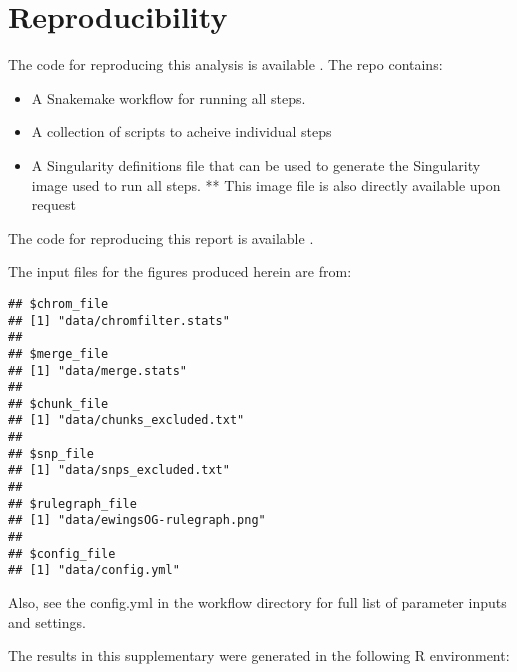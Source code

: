 \documentclass[]{article}
\providecommand{\tightlist}{%
  \setlength{\itemsep}{0pt}\setlength{\parskip}{0pt}}
\begin{document}
\newpage

\hypertarget{reproducibility}{%
\section{Reproducibility}\label{reproducibility}}

The code for reproducing this analysis is available
\href{https://github.com/pmonnahan/DataPrep/tree/master/postImpute/workflow}{{}}.
The repo contains:

\begin{itemize}
\tightlist
\item
  A Snakemake workflow for running all steps.
\item
  A collection of scripts to acheive individual steps
\item
  A Singularity definitions file that can be used to generate the
  Singularity image used to run all steps. ** This image file is also
  directly available upon request
\end{itemize}

The code for reproducing this report is available
\href{https://github.com/pmonnahan/DataPrep/blob/master/scripts/postImpute_report.Rmd}{{}}.

The input files for the figures produced herein are from:

\begin{verbatim}
## $chrom_file
## [1] "data/chromfilter.stats"
## 
## $merge_file
## [1] "data/merge.stats"
## 
## $chunk_file
## [1] "data/chunks_excluded.txt"
## 
## $snp_file
## [1] "data/snps_excluded.txt"
## 
## $rulegraph_file
## [1] "data/ewingsOG-rulegraph.png"
## 
## $config_file
## [1] "data/config.yml"
\end{verbatim}

Also, see the config.yml in the workflow directory for full list of
parameter inputs and settings.

The results in this supplementary were generated in the following R
environment:

\footnotesize
\end{document}
